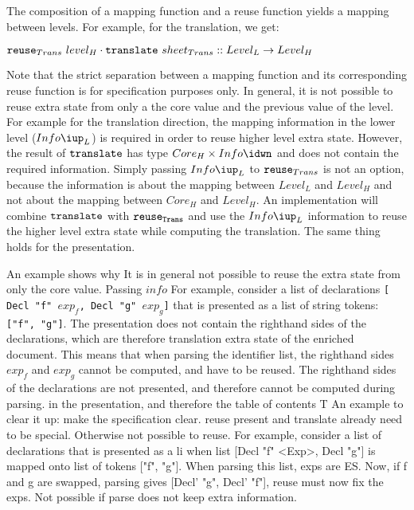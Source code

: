 The composition of a mapping function and a reuse function yields a mapping between levels. For example, for the translation, we get:

\begin{small}\begin{math}
{\tt reuse}_{Trans}~level_{H} \cdot {\tt translate}~sheet_{Trans} :: Level_{L} \rightarrow Level_{H}
\end{math}\end{small} 

Note that the strict separation between a mapping function and its corresponding reuse function is for specification purposes only. In general, it is not possible to reuse extra state from only a the core value and the previous value of the level. For example for the translation direction, the mapping information in the lower level ($Info\iup_{L}$) is required in order to reuse higher level extra state. However, the result of ${\tt translate}$ has type 
$Core_{H}\times Info\idwn$ and does not contain the required information. Simply passing $Info\iup_{L}$ to ${\tt reuse}_{Trans}$ is not an option, because the information is about the mapping between $Level_{L}$ and $Level_{H}$ and not about the mapping between $Core_{H}$ and $Level_{H}$. An implementation will combine ${\tt translate}$ with ${\tt reuse_{Trans}}$ and use the $Info\iup_{L}$ information to reuse the higher level extra state while computing the translation. The same thing holds for the presentation.


\bc
 An example shows why It is in general not possible to reuse the extra state from only the core value. Passing $info$
For example, consider a list of declarations {\tt [ Decl "f" $exp_f$, Decl "g" $exp_g$]} that is presented as a list of string tokens: {\tt ["f", "g"]}. The presentation does not contain the righthand sides of the declarations, which are therefore translation extra state of the enriched document. This means that when parsing the identifier list, the righthand sides $exp_f$ and $exp_g$ cannot be computed, and have to be reused. 
The righthand sides of the declarations are not presented, and therefore cannot be computed during parsing. in the presentation, and therefore the table of contents T
An example to clear it up:
 make the specification clear. 
 reuse present and translate already need to be special. Otherwise not possible to reuse. For example, consider a list of declarations that is presented as a li when list [Decl "f" <Exp>, Decl "g"] is mapped onto list of tokens ["f", "g"]. When parsing this list, exps are ES. Now, if f and g are swapped, parsing gives [Decl' "g", Decl' "f"],  reuse must now fix the exps. Not possible if parse does not keep extra information.
\ec

